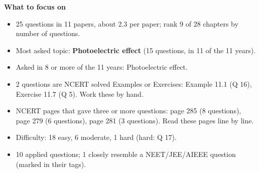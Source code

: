 \begin{minipage}[t]{0.63\linewidth}{\small\textbf{\color{crimson}What to focus on}\par\smallskip
\begin{itemize}[leftmargin=1.1em,itemsep=1pt,topsep=0pt]
\item 25 questions in 11 papers, about 2.3 per paper; rank 9 of 28 chapters by number of questions.
\item Most asked topic: \textbf{Photoelectric effect} (15 questions, in 11 of the 11 years).
\item Asked in 8 or more of the 11 years: Photoelectric effect.
\item 2 questions are NCERT solved Examples or Exercises: Example 11.1 (Q 16), Exercise 11.7 (Q 5). Work these by hand.
\item NCERT pages that gave three or more questions: page 285 (8 questions), page 279 (6 questions), page 281 (3 questions). Read these pages line by line.
\item Difficulty: 18 easy, 6 moderate, 1 hard (hard: Q 17).
\item 10 applied questions; 1 closely resemble a NEET/JEE/AIEEE question (marked in their tags).
\end{itemize}}\end{minipage}\par
{}
